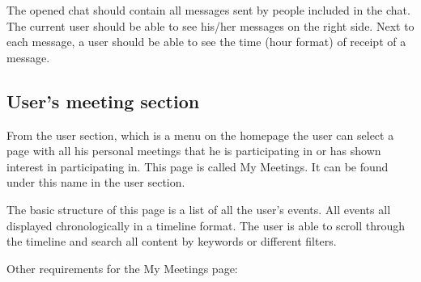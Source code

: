 \documentclass[conference]{IEEEtran}
\begin{document}
The opened chat should contain all messages sent by people included in the chat. The current user should be able to see his/her messages on the right side. Next to each message, a user should be able to see the time (hour format) of receipt of a message.

\subsection{User’s meeting section}

From the user section, which is a menu on the homepage
the user can select a page with all his personal meetings that he is participating in or has shown interest in participating in. This page is called My Meetings. It can be found under this name in the user section.

The basic structure of this page is a list of all the user’s events. All events all displayed chronologically in a timeline format. The user is able to scroll through the timeline and search all content by keywords or different filters.

Other requirements for the My Meetings page:
\end{document}
